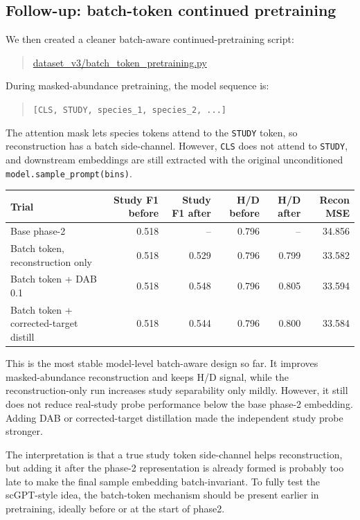 \documentclass[11pt]{article}
\newcommand{\code}[1]{\texttt{\small #1}}
\newcommand{\filepath}[1]{\begingroup\urlstyle{tt}\small\url{#1}\endgroup}
\begin{document}
\subsection{Follow-up: batch-token continued pretraining}

We then created a cleaner batch-aware continued-pretraining script:

\begin{quote}
\filepath{dataset_v3/batch_token_pretraining.py}
\end{quote}

During masked-abundance pretraining, the model sequence is:

\begin{quote}
\code{[CLS, STUDY, species\_1, species\_2, ...]}
\end{quote}

The attention mask lets species tokens attend to the \code{STUDY} token, so reconstruction
has a batch side-channel. However, \code{CLS} does not attend to \code{STUDY}, and
downstream embeddings are still extracted with the original unconditioned
\code{model.sample\_prompt(bins)}.

\begin{center}
\begin{tabular}{lrrrrr}
\toprule
Trial & Study F1 before & Study F1 after & H/D before & H/D after & Recon MSE \\
\midrule
Base phase-2 & 0.518 & -- & 0.796 & -- & 34.856 \\
Batch token, reconstruction only & 0.518 & 0.529 & 0.796 & 0.799 & 33.582 \\
Batch token + DAB 0.1 & 0.518 & 0.548 & 0.796 & 0.805 & 33.594 \\
Batch token + corrected-target distill & 0.518 & 0.544 & 0.796 & 0.800 & 33.584 \\
\bottomrule
\end{tabular}
\end{center}

This is the most stable model-level batch-aware design so far. It improves
masked-abundance reconstruction and keeps H/D signal, while the reconstruction-only run
increases study separability only mildly. However, it still does not reduce real-study
probe performance below the base phase-2 embedding. Adding DAB or corrected-target
distillation made the independent study probe stronger.

The interpretation is that a true study token side-channel helps reconstruction, but
adding it after the phase-2 representation is already formed is probably too late to make
the final sample embedding batch-invariant. To fully test the scGPT-style idea, the
batch-token mechanism should be present earlier in pretraining, ideally before or at the
start of phase2.
\end{document}
